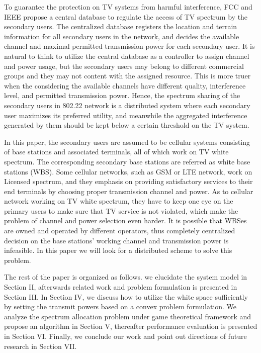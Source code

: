 To guarantee the protection on TV systems from harmful interference, FCC and IEEE propose a central database to regulate the access of TV spectrum by the secondary users.
The centralized database registers the location and terrain information for all secondary users in the network, and decides the available channel and maximal permitted transmission power for each secondary user. 
It is natural to think to utilize the central database as a controller to assign channel and power usage, but the secondary users may belong to different commercial groups and they may not content with the assigned resource.
This is more truer when the considering the available channels have different quality, \ie interference level, and permitted transmission power.
Hence, the spectrum sharing of the secondary users in 802.22 network is a distributed system where each secondary user maximizes its preferred utility, and meanwhile the aggregated interference generated by them should be kept below a certain threshold on the TV system.

In this paper, the secondary users are assumed to be cellular systems consisting of base stations and associated terminals, all of which work on TV white spectrum. The corresponding secondary base stations are referred as white base stations (WBS). Some cellular networks, such as GSM or LTE network, work on Licensed spectrum, and they emphasis on providing satisfactory services to their end terminals by choosing proper transmission channel and power. As to cellular network working on TV white spectrum, they have to keep one eye on the primary users to make sure that TV service is not violated, which make the problem of channel and power selection even harder. It is possible that WBSes are owned and operated by different operators, thus completely centralized decision on the base stations' working channel and transmission power is infeasible. In this paper we will look for a distributed scheme to solve this problem.

The rest of the paper is organized as follows. we elucidate the system model in Section II, afterwards related work and problem formulation is presented in Section III. In Section IV, we discuss how to utilize the white space sufficiently by setting the transmit powers based on a convex problem formulation. We analyze the spectrum allocation problem under game theoretical framework and propose an algorithm in Section V, thereafter performance evaluation is presented in Section VI. Finally, we conclude our work and point out directions of future research in Section VII.


